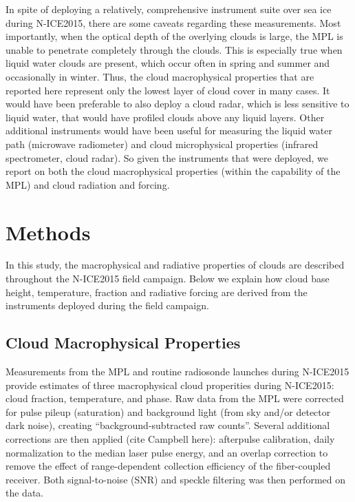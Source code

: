 In spite of deploying a relatively, comprehensive instrument suite over sea ice during N-ICE2015, there are some caveats regarding these measurements. Most importantly, when the optical depth of the overlying clouds is large, the MPL is unable to penetrate completely through the clouds. This is especially true when liquid water clouds are present, which occur often in spring and summer and occasionally in winter. Thus, the cloud macrophysical properties that are reported here represent only the lowest layer of cloud cover in many cases. It would have been preferable to also deploy a cloud radar, which is less sensitive to liquid water, that would have profiled clouds above any liquid layers. Other additional instruments would have been useful for measuring the liquid water path (microwave radiometer) and cloud microphysical properties (infrared spectrometer, cloud radar). So given the instruments that were deployed, we report on both the cloud macrophysical properties (within the capability of the MPL) and cloud radiation and forcing. 


\section{Methods}

In this study, the macrophysical and radiative properties of clouds are described throughout the N-ICE2015 field campaign. Below we explain how cloud base height, temperature, fraction and radiative forcing are derived from the instruments deployed during the field campaign.

\subsection{Cloud Macrophysical Properties}
Measurements from the MPL and routine radiosonde launches during N-ICE2015 provide estimates of three macrophysical cloud properities during N-ICE2015: cloud fraction, temperature, and phase. Raw data from the MPL were corrected for pulse pileup (saturation) and background light (from sky and/or detector dark noise), creating “background-subtracted raw counts”. Several additional corrections are then applied (cite Campbell here): afterpulse calibration, daily normalization to the median laser pulse energy, and an overlap correction to remove the effect of range-dependent collection efficiency of the fiber-coupled receiver. Both signal-to-noise (SNR) and speckle filtering was then performed on the data.


